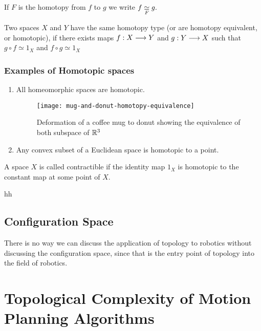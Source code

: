 \begin{notn}
If $F$ is the homotopy from $f$ to $g$ we write $\displaystyle f \underset{F}{\simeq} g.$
\end{notn}

\begin{defn}
Two spaces $X$ and $Y$ have the same homotopy type (or are homotopy equivalent, or homotopic), if there exists maps $f: X \longrightarrow Y$ and $g : Y \longrightarrow X$ such that $g \circ f \simeq 1_X$ and $f \circ g \simeq 1_X$
\end{defn}

\subsection*{Examples of Homotopic spaces}
\begin{enumerate}
\item All homeomorphic spaces are homotopic.
\begin{figure}[H]
    \centering
    \texttt{[image: mug-and-donut-homotopy-equivalence]}
    \caption{Deformation of a coffee mug to donut showing the equivalence of both subspace of $\mathbb{R}^3$}
\end{figure}
\item Any convex subset of a Euclidean space is homotopic to a point.
\end{enumerate}

\begin{defn}
A space $X$ is called contractible if the identity map $1_X$ is homotopic to the constant map at some point of $X$.
\end{defn}

\begin{defn}[Manifold]
    hh
\end{defn}

\section{Configuration Space}
There is no way we can discuss the application of topology to robotics without discussing the configuration space, since that is the entry point of topology into the field of robotics.

\chapter{Topological Complexity of Motion Planning Algorithms}

